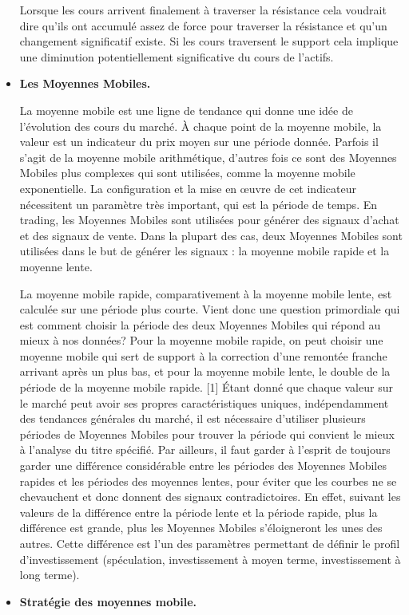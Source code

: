 \begin{itemize}
  Lorsque les cours arrivent finalement à traverser la résistance cela
  voudrait dire qu'ils ont accumulé assez de force pour traverser la
  résistance et qu'un changement significatif existe. Si les cours
  traversent le support cela implique une diminution potentiellement
  significative du cours de l'actifs.
\item
  \textbf{Les Moyennes Mobiles.}

  {La moyenne mobile est une ligne de tendance qui donne une idée de
  l'évolution des cours du marché. À chaque point de la moyenne mobile,
  la valeur est un indicateur du prix moyen sur une période donnée.
  Parfois il s'agit de la moyenne mobile arithmétique, d'autres fois ce
  sont des Moyennes Mobiles plus complexes qui sont utilisées, comme la
  moyenne mobile exponentielle. La configuration et la mise en œuvre de
  cet indicateur nécessitent un paramètre très important, qui est la
  période de temps. En trading, les Moyennes Mobiles sont utilisées pour
  générer des signaux d'achat et des signaux de vente. Dans la plupart
  des cas, deux Moyennes Mobiles sont utilisées dans le but de générer
  les signaux : la moyenne mobile rapide et la moyenne lente.}

  {La moyenne mobile rapide, comparativement à la moyenne mobile lente,
  est calculée sur une période plus courte. Vient donc une question
  primordiale qui est comment choisir la période des deux Moyennes
  Mobiles qui répond au mieux à nos données? Pour la moyenne mobile
  rapide, on peut choisir une moyenne mobile qui sert de support à la
  correction d'une remontée franche arrivant après un plus bas, et pour
  la moyenne mobile lente, le double de la période de la moyenne mobile
  rapide. {[}1{]} Étant donné que chaque valeur sur le marché peut avoir
  ses propres caractéristiques uniques, indépendamment des tendances
  générales du marché, il est nécessaire d'utiliser plusieurs périodes
  de Moyennes Mobiles pour trouver la période qui convient le mieux à
  l'analyse du titre spécifié. Par ailleurs, il faut garder à l'esprit
  de toujours garder une différence considérable entre les périodes des
  Moyennes Mobiles rapides et les périodes des moyennes lentes, pour
  éviter que les courbes ne se chevauchent et donc donnent des signaux
  contradictoires. En effet, suivant les valeurs de la différence entre
  la période lente et la période rapide, plus la différence est grande,
  plus les Moyennes Mobiles s'éloigneront les unes des autres. Cette
  différence est l'un des paramètres permettant de définir le profil
  d'investissement (spéculation, investissement à moyen terme,
  investissement à long terme). }
\item
  \textbf{Stratégie des moyennes mobile.}


\end{itemize}
